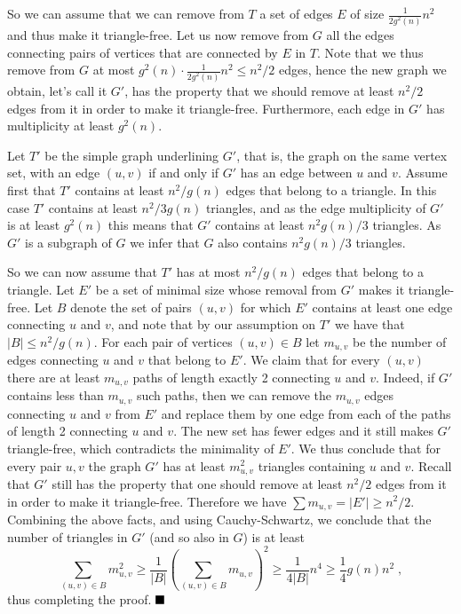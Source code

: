 \documentclass [letterpaper,11pt]{article}
\newcommand{\qed}{\hspace*{\fill} \rule{7pt}{7pt}}
\begin{document}
So we can assume that we can remove from $T$ a set of edges $E$ of
size $\frac{1}{2g^2(n)}n^2$ and thus make it triangle-free. Let us
now remove from $G$ all the edges connecting pairs of vertices that
are connected by $E$ in $T$. Note that we thus remove from $G$ at
most $g^2(n) \cdot \frac{1}{2g^2(n)}n^2 \leq n^2/2$ edges, hence the
new graph we obtain, let's call it $G'$, has the property that we
should remove at least $n^2/2$ edges from it in order to make it
triangle-free. Furthermore, each edge in $G'$ has multiplicity at
least $g^2(n)$.

Let $T'$ be the simple graph underlining $G'$, that is, the graph on
the same vertex set, with an edge $(u,v)$ if and only if $G'$ has an
edge between $u$ and $v$. Assume first that $T'$ contains at least
$n^2/g(n)$ edges that belong to a triangle. In this case $T'$
contains at least $n^2/3g(n)$ triangles, and as the edge multiplicity
of $G'$ is at least $g^2(n)$ this means that $G'$ contains at least
$n^2g(n)/3$ triangles. As $G'$ is a subgraph of $G$ we infer that
$G$ also contains $n^2g(n)/3$ triangles.

So we can now assume that $T'$ has at most $n^2/g(n)$ edges that
belong to a triangle. Let $E'$ be a set of minimal size whose
removal from $G'$ makes it triangle-free. Let $B$ denote the set of
pairs $(u,v)$ for which $E'$ contains at least one edge connecting
$u$ and $v$, and note that by our assumption on $T'$ we have that
$|B| \leq n^2/g(n)$. For each pair of vertices $(u,v) \in B$ let
$m_{u,v}$ be the number of edges connecting $u$ and $v$ that belong
to $E'$. We claim that for every $(u,v)$ there are at least
$m_{u,v}$ paths of length exactly 2 connecting $u$ and $v$. Indeed,
if $G'$ contains less than $m_{u,v}$ such paths, then we can remove
the $m_{u,v}$ edges connecting $u$ and $v$ from $E'$ and replace
them by one edge from each of the paths of length 2 connecting $u$
and $v$. The new set has fewer edges and it still makes $G'$
triangle-free, which contradicts the minimality of $E'$. We thus
conclude that for every pair $u,v$ the graph $G'$ has at least
$m^2_{u,v}$ triangles containing $u$ and $v$. Recall that $G'$ still
has the property that one should remove at least $n^2/2$ edges from
it in order to make it triangle-free. Therefore we have $\sum
m_{u,v} =|E'| \geq n^2/2$. Combining the above facts, and using
Cauchy-Schwartz, we conclude that the number of triangles in $G'$
(and so also in $G$) is at least
$$
\sum_{(u,v) \in B} m^2_{u,v} \geq \frac{1}{|B|}\left(\sum_{(u,v) \in
B}m_{u,v}\right)^2 \geq \frac{1}{4|B|}n^4 \geq \frac14g(n)n^2\;,
$$
thus completing the proof. $\qed$
\end{document}
